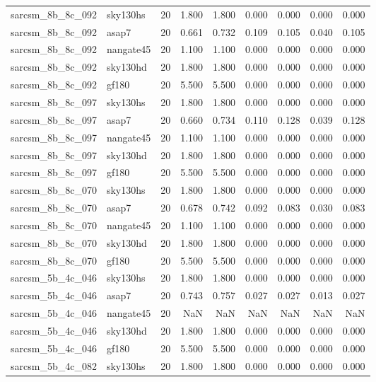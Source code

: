 \begin{tabular}{llrrrrrrr}
sarcsm\_8b\_8c\_092 & sky130hs & 20 & 1.800 & 1.800 & 0.000 & 0.000 & 0.000 & 0.000 \\
sarcsm\_8b\_8c\_092 & asap7 & 20 & 0.661 & 0.732 & 0.109 & 0.105 & 0.040 & 0.105 \\
sarcsm\_8b\_8c\_092 & nangate45 & 20 & 1.100 & 1.100 & 0.000 & 0.000 & 0.000 & 0.000 \\
sarcsm\_8b\_8c\_092 & sky130hd & 20 & 1.800 & 1.800 & 0.000 & 0.000 & 0.000 & 0.000 \\
sarcsm\_8b\_8c\_092 & gf180 & 20 & 5.500 & 5.500 & 0.000 & 0.000 & 0.000 & 0.000 \\
sarcsm\_8b\_8c\_097 & sky130hs & 20 & 1.800 & 1.800 & 0.000 & 0.000 & 0.000 & 0.000 \\
sarcsm\_8b\_8c\_097 & asap7 & 20 & 0.660 & 0.734 & 0.110 & 0.128 & 0.039 & 0.128 \\
sarcsm\_8b\_8c\_097 & nangate45 & 20 & 1.100 & 1.100 & 0.000 & 0.000 & 0.000 & 0.000 \\
sarcsm\_8b\_8c\_097 & sky130hd & 20 & 1.800 & 1.800 & 0.000 & 0.000 & 0.000 & 0.000 \\
sarcsm\_8b\_8c\_097 & gf180 & 20 & 5.500 & 5.500 & 0.000 & 0.000 & 0.000 & 0.000 \\
sarcsm\_8b\_8c\_070 & sky130hs & 20 & 1.800 & 1.800 & 0.000 & 0.000 & 0.000 & 0.000 \\
sarcsm\_8b\_8c\_070 & asap7 & 20 & 0.678 & 0.742 & 0.092 & 0.083 & 0.030 & 0.083 \\
sarcsm\_8b\_8c\_070 & nangate45 & 20 & 1.100 & 1.100 & 0.000 & 0.000 & 0.000 & 0.000 \\
sarcsm\_8b\_8c\_070 & sky130hd & 20 & 1.800 & 1.800 & 0.000 & 0.000 & 0.000 & 0.000 \\
sarcsm\_8b\_8c\_070 & gf180 & 20 & 5.500 & 5.500 & 0.000 & 0.000 & 0.000 & 0.000 \\
sarcsm\_5b\_4c\_046 & sky130hs & 20 & 1.800 & 1.800 & 0.000 & 0.000 & 0.000 & 0.000 \\
sarcsm\_5b\_4c\_046 & asap7 & 20 & 0.743 & 0.757 & 0.027 & 0.027 & 0.013 & 0.027 \\
sarcsm\_5b\_4c\_046 & nangate45 & 20 & NaN & NaN & NaN & NaN & NaN & NaN \\
sarcsm\_5b\_4c\_046 & sky130hd & 20 & 1.800 & 1.800 & 0.000 & 0.000 & 0.000 & 0.000 \\
sarcsm\_5b\_4c\_046 & gf180 & 20 & 5.500 & 5.500 & 0.000 & 0.000 & 0.000 & 0.000 \\
sarcsm\_5b\_4c\_082 & sky130hs & 20 & 1.800 & 1.800 & 0.000 & 0.000 & 0.000 & 0.000 \\

\end{tabular}
